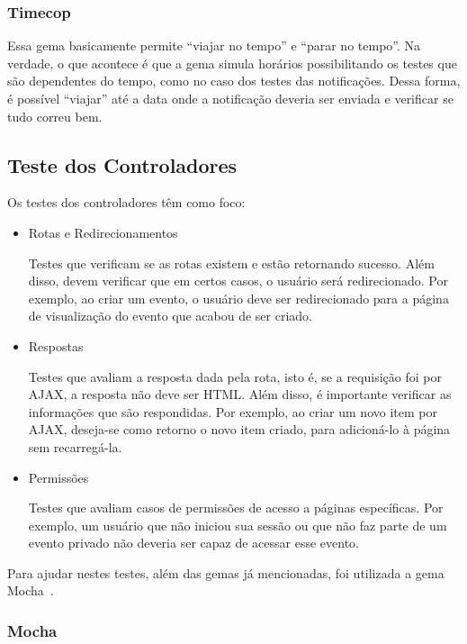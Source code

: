 \subsubsection{Timecop~\cite{timecop}}

Essa gema basicamente permite ``viajar no tempo'' e ``parar no tempo''. Na verdade, o que acontece é que a gema simula horários possibilitando os testes que são dependentes do tempo, como no caso dos testes das notificações. Dessa forma, é possível ``viajar'' até a data onde a notificação deveria ser enviada e verificar se tudo correu bem.

\subsection{Teste dos Controladores}

Os testes dos controladores têm como foco:

\begin{itemize}
\item Rotas e Redirecionamentos

Testes que verificam se as rotas existem e estão retornando sucesso. Além disso, devem verificar que em certos casos, o usuário será redirecionado. Por exemplo, ao criar um evento, o usuário deve ser redirecionado para a página de visualização do evento que acabou de ser criado.

\item Respostas

Testes que avaliam a resposta dada pela rota, isto é, se a requisição foi por AJAX, a resposta não deve ser HTML. Além disso, é importante verificar as informações que são respondidas. Por exemplo, ao criar um novo item por AJAX, deseja-se como retorno o novo item criado, para adicioná-lo à página sem recarregá-la.

\item Permissões

Testes que avaliam casos de permissões de acesso a páginas específicas. Por exemplo, um usuário que não iniciou sua sessão ou que não faz parte de um evento privado não deveria ser capaz de acessar esse evento.

\end{itemize}

Para ajudar nestes testes, além das gemas já mencionadas, foi utilizada a gema Mocha~\cite{mocha}.

\subsubsection{Mocha}

